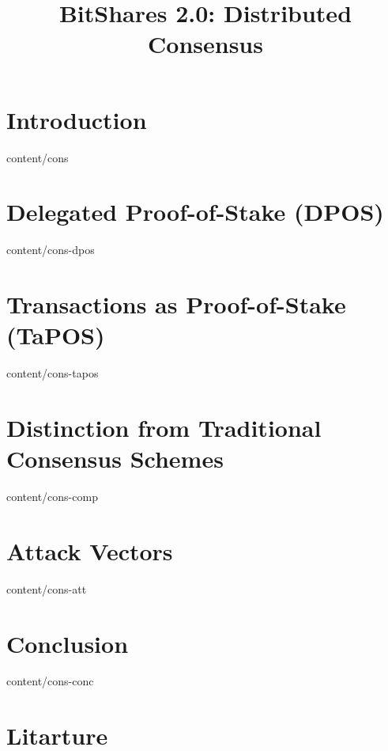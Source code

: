 \documentclass[conference,final,10pt,a4paper]{IEEEtran}
\title{BitShares 2.0: Distributed Consensus}
\begin{document}
\sloppy
\maketitle

\begin{abstract}
\end{abstract}
\section    { Introduction                                   }  { content/cons          } 
\section    { Delegated Proof-of-Stake (DPOS)                }  { content/cons-dpos     } 
\section    { Transactions as Proof-of-Stake (TaPOS)         }  { content/cons-tapos    } 
\section    { Distinction from Traditional Consensus Schemes }  { content/cons-comp     } 
\section    { Attack Vectors                                 }  { content/cons-att      } 
\section    { Conclusion                                     }  { content/cons-conc     } 
\section*   { Litarture                                      }


\end{document}

